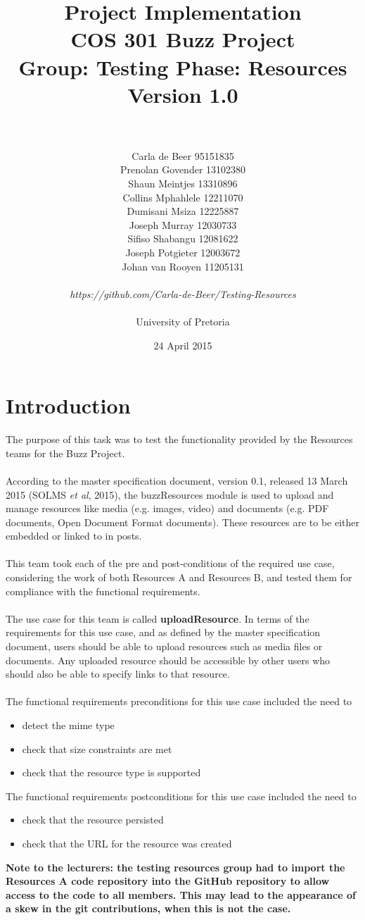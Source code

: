 \documentclass[a4paper]{article}
\title{Project Implementation
\\COS 301 Buzz Project
\\Group: Testing Phase: Resources
\\Version 1.0}
\author{
\\
\\Carla de Beer 95151835
\\Prenolan Govender 13102380
\\Shaun Meintjes 13310896
\\Collins Mphahlele 12211070
\\Dumisani Msiza 12225887
\\Joseph Murray 12030733
\\Sifiso Shabangu 12081622
\\Joseph Potgieter 12003672
\\Johan van Rooyen 11205131
\\
\\
\textit{https://github.com/Carla-de-Beer/Testing-Resources}
\\
\\ University of Pretoria}
\date{24 April 2015}
\begin{document}
\maketitle
\newpage


\tableofcontents
\newpage

\section{Introduction}

The purpose of this task was to test the functionality provided by the Resources teams for the Buzz Project.
\\
\\
According to the master specification document, version 0.1, released 13 March 2015 (SOLMS \textit{et al}, 2015), the buzzResources module is used to upload and manage resources like media (e.g. images, video) and documents (e.g. PDF documents, Open Document Format documents). These resources are to be either embedded or linked to in posts.
\\
\\
This team took each of the pre and post-conditions of the required use case, considering the work of both Resources A and Resources B, and tested them for compliance with the functional requirements. 
\\
\\The use case for this team is called \textbf{uploadResource}. In terms of the requirements for this use case, and as defined by the master specification document, users should be able to upload resources such as media files or documents. Any uploaded resource should be accessible by other users who should also be able to specify links to that resource. 
\\
\\The functional requirements preconditions for this use case included the need to
\begin{itemize}
\item detect the mime type
\item check that size constraints are met
\item check that the resource type is supported
\end{itemize}
The functional requirements postconditions for this use case included the need to
\begin{itemize}
\item check that the resource persisted
\item check that the URL for the resource was created
\end{itemize}
\textbf{Note to the lecturers: the testing resources group had to import the Resources A code repository into the GitHub repository to allow access to the code to all members. This may lead to the appearance of a skew in the git contributions, when this is not the case.}
\end{document}
